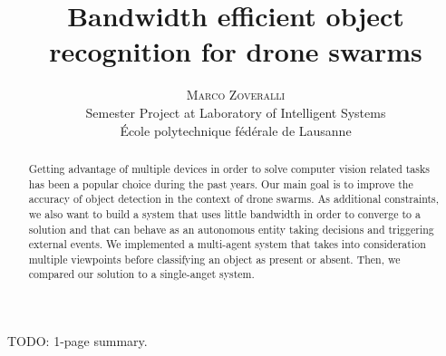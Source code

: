 \documentclass[10pt,conference,compsocconf]{IEEEtran}
\begin{document}
	
\pretitle{\begin{center}\Huge\bfseries} %
\posttitle{\end{center}} %
\title{Bandwidth efficient object recognition for drone swarms}

\author{
	\textsc{Marco Zoveralli} \\
	\normalsize{Semester Project at Laboratory of Intelligent Systems} \\
	\normalsize \'{E}cole polytechnique f\'{e}d\'{e}rale de Lausanne
}

\maketitle
TODO: 1-page summary.
\clearpage{}

\begin{abstract}
Getting advantage of multiple devices in order to solve computer vision related tasks has been a popular choice during the past years. Our main goal is to improve the accuracy of object detection in the context of drone swarms. As additional constraints, we also want to build a system that uses little bandwidth in order to converge to a solution and that can behave as an autonomous entity taking decisions and triggering external events. We implemented a multi-agent system that takes into consideration multiple viewpoints before classifying an object as present or absent. Then, we compared our solution to a single-anget system.
\end{abstract}

\end{document}

